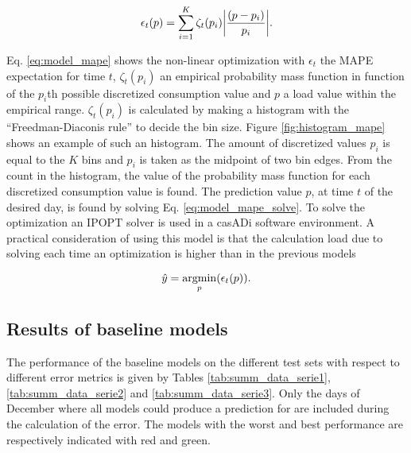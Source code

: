  \begin{equation}\label{eq:model_mape} 	
 	\epsilon_{t}(p) = \sum_{i=1}^K \zeta_{t}(p_i)\abs{\frac{(p-p_{i})}{p_{i}}}.
 \end{equation}

Eq. \ref{eq:model_mape} shows the non-linear optimization with $ \epsilon_{t} $ the MAPE expectation for time $ t $, $\zeta_{t}(p_i)$ an empirical probability mass function in function of the $ p_i $th possible discretized consumption value and $ p $ a load value within the empirical range. $ \zeta_{t}(p_i) $ is calculated by making a histogram with the ``Freedman-Diaconis rule'' to decide the bin size. Figure \ref{fig:histogram_mape} shows an example of such an histogram. The amount of discretized values $ p_i $ is equal to the $ K $ bins and $ p_i $ is taken as the midpoint of two bin edges. From the count in the histogram, the value of the probability mass function for each discretized consumption value is found. The prediction value $ p $, at time $ t $ of the desired day, is found by solving Eq. \ref{eq:model_mape_solve}. To solve the optimization an IPOPT solver is used in a casADi software environment. A practical consideration of using this model is that the calculation load due to solving each time an optimization is higher than in the previous models

\begin{equation}\label{eq:model_mape_solve} 	
	\hat{y} = \operatorname*{argmin}_{p}(\epsilon_{t}(p)).
\end{equation}
 
 
\subsection{Results of baseline models}
The performance of the baseline models on the different test sets with respect to different error metrics is given by Tables \ref{tab:summ_data_serie1}, \ref{tab:summ_data_serie2} and \ref{tab:summ_data_serie3}. Only the days of December where all models could produce a prediction for are included during the calculation of the error. The models with the worst and best performance are respectively indicated with red and green.  

